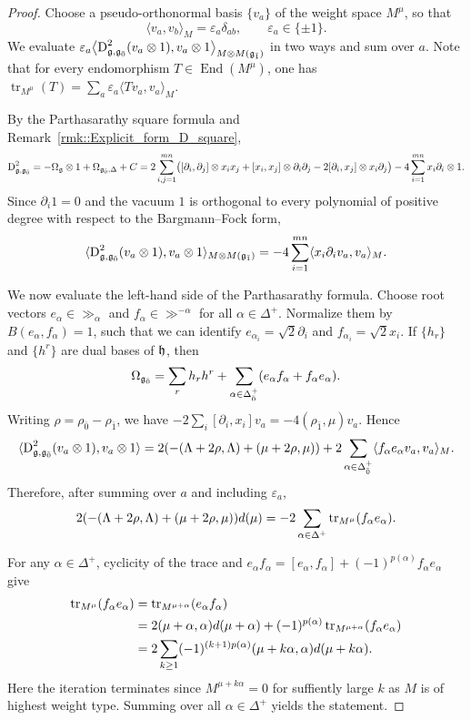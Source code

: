\begin{proof} Choose a pseudo-orthonormal basis $\{v_a\}$ of the weight space $M^\mu$, so that
\[
\langle v_a,v_b\rangle_M
=
\varepsilon_a\delta_{ab},
\qquad
\varepsilon_a\in\{\pm1\}.
\] We evaluate
$
\varepsilon_a
\bigl\langle
\operatorname{D}_{{\mathfrak{g}},{\mathfrak{g}_{\bar{0}}}}^{2}(v_a\otimes1),
v_a\otimes1
\bigr\rangle_{M\otimes M({\mathfrak{g}_{\bar{1}}})}
$
in two ways and sum over $a$. Note that for every endomorphism
$T\in\operatorname{End}(M^\mu)$, one has
$
\operatorname{tr}_{M^\mu}(T)
=
\sum_a
\varepsilon_a
\langle Tv_a,v_a\rangle_M.
$

By the Parthasarathy square formula and
 Remark~\ref{rmk::Explicit_form_D_square},
 \[
 \operatorname{D}_{{\mathfrak{g}},{\mathfrak{g}_{\bar{0}}}}^{2}
 =
 -\Omega_{{\mathfrak{g}}}\otimes1+\Omega_{{\mathfrak{g}_{\bar{0}}},\Delta}+C
 =
 2\sum_{i,j=1}^{mn}
 \bigl(
 [\partial_i,\partial_j]\otimes x_ix_j
 +[x_i,x_j]\otimes\partial_i\partial_j
 -2[\partial_i,x_j]\otimes x_i\partial_j
 \bigr)
 -4\sum_{i=1}^{mn}x_i\partial_i\otimes1.
 \]
 Since $\partial_i1=0$ and the vacuum $1$ is orthogonal to every polynomial of positive degree with respect to the Bargmann--Fock form,
 \[
 \langle\operatorname{D}_{{\mathfrak{g}},{\mathfrak{g}_{\bar{0}}}}^{2}(v_a\otimes1),v_a\otimes1\rangle_{M\otimes M({\mathfrak{g}_{\bar{1}}})}
 =
 -4\sum_{i=1}^{mn}\langle x_i\partial_i v_a,v_a\rangle_M.
 \]

 We now evaluate the left-hand side of the Parthasarathy formula. Choose root vectors $e_\alpha\in\gg_\alpha$ and $f_\alpha\in\gg^{-\alpha}$ for all $\alpha\in\Delta^+$. Normalize them by $B(e_\alpha,f_\alpha)=1$, such that we can identify $e_{\alpha_i}=\sqrt{2}\partial_i$ and $f_{\alpha_i}=\sqrt{2}x_i$. If $\{h_r\}$ and $\{h^r\}$ are dual bases of ${\mathfrak h}$, then
 \[
 \Omega_{{\mathfrak{g}_{\bar{0}}}}
 =
 \sum_r h_rh^r
 +
 \sum_{\alpha\in\Delta_{\bar0}^+}
 (e_\alpha f_\alpha+f_\alpha e_\alpha).
 \]
 Writing $\rho=\rho_{\bar0}-\rho_{\bar1}$, we have
 $-2\sum_i[\partial_i,x_i]v_a=-4(\rho_{\bar1},\mu)v_a$. Hence
 \[
 \begin{aligned}
\langle\operatorname{D}_{{\mathfrak{g}},{\mathfrak{g}_{\bar{0}}}}^{2}(v_a\otimes1),v_a\otimes1\rangle
 =
 2(-(\Lambda+2\rho,\Lambda)+(\mu+2\rho,\mu)) +2\sum_{\alpha\in\Delta_{\bar0}^+}
 \langle f_\alpha e_\alpha v_a,v_a\rangle_M.
 \end{aligned}
 \]
 Therefore, after summing over $a$ and including $\varepsilon_{a}$,
 \[
 \begin{aligned}
 2(-(\Lambda+2\rho,\Lambda)+(\mu+2\rho,\mu))d(\mu) =
 -2\sum_{\alpha\in\Delta^+}
 \operatorname{tr}_{M^\mu}(f_\alpha e_\alpha).
 \end{aligned}
 \]

For any $\alpha\in\Delta^+$, cyclicity of the trace and
$e_\alpha f_\alpha=[e_\alpha,f_\alpha]+(-1)^{p(\alpha)}f_\alpha e_\alpha$ give
\[
\begin{aligned}
\operatorname{tr}_{M^\mu}(f_\alpha e_\alpha)
&=\operatorname{tr}_{M^{\mu+\alpha}}(e_\alpha f_\alpha)\\
&=2(\mu+\alpha,\alpha)d(\mu+\alpha)
+(-1)^{p(\alpha)}\operatorname{tr}_{M^{\mu+\alpha}}(f_\alpha e_\alpha)\\
&=2\sum_{k\geq1}(-1)^{(k+1)p(\alpha)}
(\mu+k\alpha,\alpha)d(\mu+k\alpha).
\end{aligned}
\]
Here the iteration terminates since $M^{\mu+k\alpha}=0$ for suffiently large $k$ as $M$ is of highest weight type. Summing over all $\alpha \in \Delta^{+}$ yields the statement.
\end{proof}


